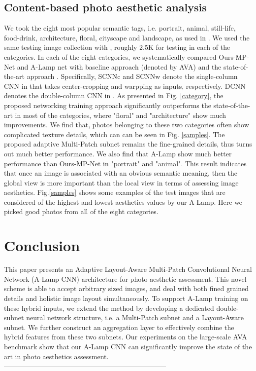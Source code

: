 \documentclass[10pt,twocolumn,letterpaper]{article}
\begin{document}
\subsection{Content-based photo aesthetic analysis} \label{content}
We took the eight most popular semantic tags, i.e. portrait, animal, still-life, food-drink, architecture, floral, cityscape and landscape, as used in \cite{Murray:MMP2012:AVA}. We used the same testing image collection with \cite{Lu:2014:TMM:rating}, roughly 2.5K for testing in each of the categories.
In each of the eight categories, we systematically compared
Ours-MP-Net and A-Lamp net with baseline approach \cite{Murray:MMP2012:AVA} (denoted by AVA) and the state-of-the-art approach \cite{Lu:2014:TMM:rating}. Specifically, SCNN{\tiny c} and SCNN{\tiny w} denote the single-column CNN in \cite{Lu:2014:TMM:rating} that takes center-cropping and warpping as inputs, respectively. DCNN denotes the double-column CNN in \cite{Lu:2014:TMM:rating}.
As presented in Fig. \ref*{category}, the proposed networking training approach significantly outperforms the state-of-the-art in most of the categories, where "floral" and "architecture" show much improvements. We find that, photos belonging to these two categories often show complicated texture details, which can can be seen in Fig. \ref{samples}. The proposed adaptive Multi-Patch subnet remains the fine-grained details, thus turns out much better performance. We also find that A-Lamp show much better performance than Ours-MP-Net in "portrait" and "animal". This result indicates that once an image is associated with an obvious semantic meaning, then the global view is more important than the local view in terms of assessing image aesthetics. Fig.\ref{samples} shows some examples of the test images that are considered of the highest and lowest aesthetics values by our A-Lamp. Here we picked good photos from all of the eight categories.

\section{Conclusion}
This paper presents an Adaptive Layout-Aware Multi-Patch Convolutional Neural Network (A-Lamp CNN) architecture for photo aesthetic assessment. This novel scheme is able to accept arbitrary sized images, and deal with both fined grained details and holistic image layout simultaneously. To support A-Lamp training on these hybrid inputs, we extend the method by developing a dedicated double-subnet neural network structure, i.e. a Multi-Patch subnet and a Layout-Aware subnet. We further construct an aggregation layer to effectively combine the hybrid features from these two subnets. Our experiments on the large-scale AVA benchmark show that our A-Lamp CNN can significantly improve the state of the art in photo aesthetics assessment.
-----------------------------------------------------------------------

\cleardoublepage
{\small
	
	
}
\end{document}
